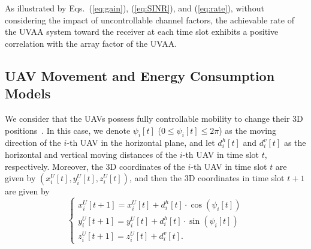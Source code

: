 \documentclass[10pt,journal,compsoc]{IEEEtran}
\begin{document}
\par As illustrated by Eqs.~(\ref{eq:gain}), (\ref{eq:SINR}), and (\ref{eq:rate}), without considering the impact of uncontrollable channel factors, the achievable rate of the UVAA system toward the receiver at each time slot exhibits a positive correlation with the array factor of the UVAA.

\subsection{UAV Movement and Energy Consumption Models}
\label{subsec: UAV Movemnt Model}

\par We consider that the UAVs possess fully controllable mobility to change their 3D positions~\cite{Yao2020Joint3D}. In this case, we denote $\psi_i[t]$ ($0 \leq \psi_i[t] \leq 2\pi$) as the moving direction of the $i$-th UAV in the horizontal plane, and let $d^h_i[t]$ and $d^v_i[t]$ as the horizontal and vertical moving distances of the $i$-th UAV in time slot $t$, respectively. Moreover, the 3D coordinates of the $i$-th UAV in time slot $t$ are given by $(x^U_i[t], y^U_i[t], z^U_i[t])$, and then the 3D coordinates in time slot $t+1$ are given by
\begin{equation}
    \left\{\begin{array}{ll}
        x^U_i[t+1] = x^U_i[t] + d^h_i[t] \cdot \cos \left(\psi_i[t]\right) \\
        y^U_i[t+1] = y^U_i[t] + d^h_i[t] \cdot \sin \left(\psi_i[t]\right) \\
        z^U_i[t+1] = z^U_i[t] + d^v_i[t].
    \end{array}\right.
\end{equation}


\end{document}
